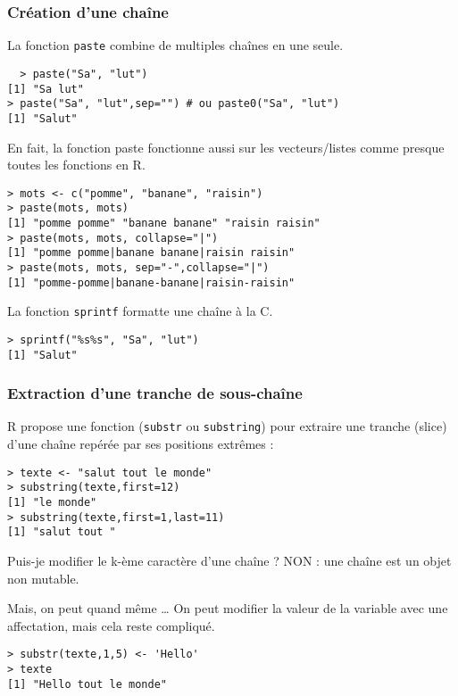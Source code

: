 \documentclass[10pt]{beamer}
\begin{document}
\begin{frame}[fragile]
  \frametitle{Création d'une chaîne}
  La fonction \alert{\texttt{paste}} combine de multiples chaînes en une seule.
  \begin{lstlisting}
  > paste("Sa", "lut")
[1] "Sa lut"
> paste("Sa", "lut",sep="") # ou paste0("Sa", "lut")
[1] "Salut"
\end{lstlisting}
En fait, la fonction paste fonctionne aussi sur les vecteurs/listes comme presque toutes les fonctions en R.
\begin{lstlisting}
> mots <- c("pomme", "banane", "raisin")
> paste(mots, mots)
[1] "pomme pomme" "banane banane" "raisin raisin"
> paste(mots, mots, collapse="|")
[1] "pomme pomme|banane banane|raisin raisin"
> paste(mots, mots, sep="-",collapse="|")
[1] "pomme-pomme|banane-banane|raisin-raisin"
\end{lstlisting}
La fonction \alert{\texttt{sprintf}} formatte une chaîne à la C.
\begin{lstlisting}
> sprintf("%s%s", "Sa", "lut")
[1] "Salut"
\end{lstlisting}
\end{frame}

\begin{frame}[fragile]
  \frametitle{Extraction d'une tranche de sous-chaîne}
  R propose une fonction (\alert{\texttt{substr}} ou \alert{\texttt{substring}}) pour extraire une tranche (slice) d'une chaîne repérée par ses positions extrêmes :
  \begin{lstlisting}
> texte <- "salut tout le monde"
> substring(texte,first=12)
[1] "le monde"
> substring(texte,first=1,last=11)
[1] "salut tout "
\end{lstlisting}

\begin{alertblock}{Puis-je modifier le k-ème caractère d'une chaîne ?}
  \alert{NON} : une chaîne est un objet non mutable.
\end{alertblock}

\begin{exampleblock}{Mais, on peut quand même \dots}
  On peut modifier la valeur de la variable avec une affectation, mais cela reste compliqué.
  \begin{lstlisting}
> substr(texte,1,5) <- 'Hello'
> texte
[1] "Hello tout le monde"
  \end{lstlisting}
\end{exampleblock}
\end{frame}
\end{document}
